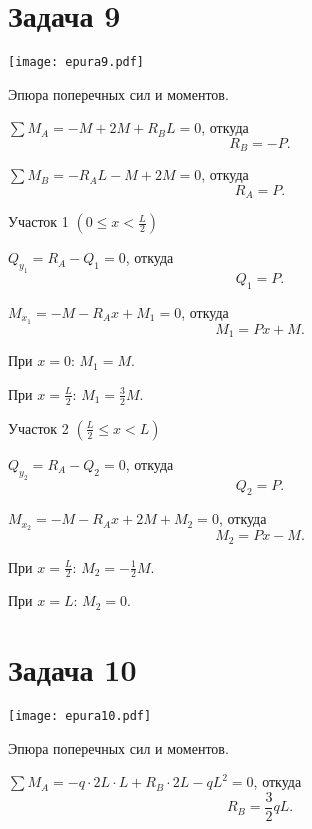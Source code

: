 \newpage


\section{Задача 9}

\begin{floatingfigure}[r]{0.5\textwidth}
    \centering
    \texttt{[image: epura9.pdf]}
    \caption{Эпюра поперечных сил и моментов.}
    \label{fig:chap1-epura9}
\end{floatingfigure}

$\sum M_A = -M + 2M + R_B L = 0$,
откуда
\[
    R_B = -P.
\]

$\sum M_B = -R_A L - M + 2M = 0$,
откуда
\[
    R_A = P.
\]

\vspace{1.5ex}

Участок 1 $\left(0 \le x < \frac{L}{2}\right)$

$Q_{y_1} = R_A - Q_1 = 0$,
откуда
\[
    Q_1 = P.
\]

$M_{x_1} = -M - R_A x + M_1 = 0$,
откуда
\[
    M_1 = Px + M.
\]

При $x = 0$: $M_1 = M$.

При $x = \frac{L}{2}$: $M_1 = \frac{3}{2} M$.

\vspace{1.5ex}

Участок 2 $\left(\frac{L}{2} \le x < L\right)$

$Q_{y_2} = R_A - Q_2 = 0$,
откуда
\[
    Q_2 = P.
\]

$M_{x_2} = -M - R_A x + 2M + M_2 = 0$,
откуда
\[
    M_2 = Px - M.
\]

При $x = \frac{L}{2}$: $M_2 = -\frac{1}{2} M$.

При $x = L$: $M_2 = 0$.

\newpage


\section{Задача 10}

\begin{floatingfigure}[r]{0.5\textwidth}
    \centering
    \texttt{[image: epura10.pdf]}
    \caption{Эпюра поперечных сил и моментов.}
    \label{fig:chap1-epura10}
\end{floatingfigure}

$\sum M_A = -q \cdot 2L \cdot L + R_B \cdot 2L - qL^2 = 0$,
откуда
\[
    R_B = \frac{3}{2}qL.
\]


